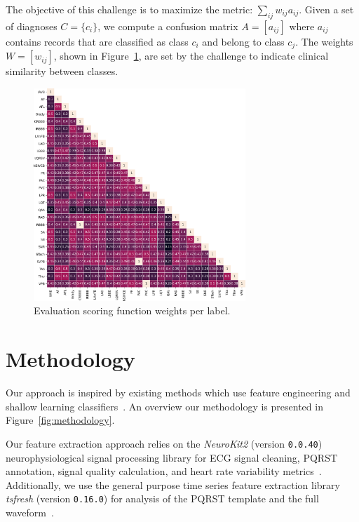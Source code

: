 \documentclass[twocolumn]{cinc}
\begin{document}
The objective of this challenge is to maximize the metric: $\sum_{ij} w_{ij} a_{ij}$.
Given a set of diagnoses $C = \{c_i\}$, we compute a confusion matrix $A = [a_{ij}]$ where $a_{ij}$ contains records that are classified as class $c_i$ and belong to class $c_j$.
The weights $W = [w_{ij}]$, shown in Figure~\ref{fig:dataset_labeldx}, are set by the challenge to indicate clinical similarity between classes.


\begin{figure}[ht]
  \centering
  \includegraphics[width=8cm]{fig/label_weights.png}
  \caption{Evaluation scoring function weights per label.}
  \label{fig:dataset_labeldx}
\end{figure}

\section{Methodology}

Our approach is inspired by existing methods which use feature engineering and shallow learning classifiers~\cite{goodwin_classification_2017}.
An overview our methodology is presented in Figure~\ref{fig:methodology}.

Our feature extraction approach relies on the \emph{NeuroKit2} (version \texttt{0.0.40}) neurophysiological signal processing library for ECG signal cleaning, PQRST annotation, signal quality calculation, and heart rate variability metrics~\cite{neurokit2}.
Additionally, we use the general purpose time series feature extraction library \emph{tsfresh} (version \texttt{0.16.0}) for analysis of the PQRST template and the full waveform~\cite{CHRIST201872}.
\end{document}
